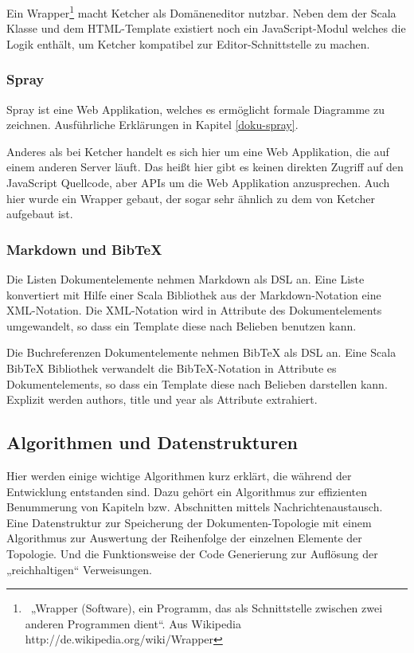  
Ein Wrapper\footnote{~„Wrapper (Software), ein Programm, das als Schnittstelle zwischen zwei anderen Programmen dient“. Aus Wikipedia http://de.wikipedia.org/wiki/Wrapper} macht Ketcher als Domäneneditor nutzbar. Neben dem der Scala Klasse und dem HTML-Template existiert noch ein JavaScript-Modul welches die Logik enthält, um Ketcher kompatibel zur Editor-Schnittstelle zu machen.

 
\subsubsection{Spray}\label{}

 
Spray ist eine Web Applikation, welches es ermöglicht formale Diagramme zu zeichnen. Ausführliche Erklärungen in Kapitel \ref{doku-spray}.

 
Anderes als bei Ketcher handelt es sich hier um eine Web Applikation, die auf einem anderen Server läuft. Das heißt hier gibt es keinen direkten Zugriff auf den JavaScript Quellcode, aber APIs um die Web Applikation anzusprechen. Auch hier wurde ein Wrapper gebaut, der sogar sehr ähnlich zu dem von Ketcher aufgebaut ist.

 
\subsubsection{Markdown und BibTeX}\label{}

 
Die Listen Dokumentelemente nehmen Markdown als DSL an. Eine Liste konvertiert mit Hilfe einer Scala Bibliothek aus der Markdown-Notation eine XML-Notation. Die XML-Notation wird in Attribute des Dokumentelements umgewandelt, so dass ein Template diese nach Belieben benutzen kann.

 
Die Buchreferenzen Dokumentelemente nehmen BibTeX als DSL an. Eine Scala BibTeX Bibliothek verwandelt die BibTeX-Notation in Attribute es Dokumentelements, so dass ein Template diese nach Belieben darstellen kann. Explizit werden authors, title und year als Attribute extrahiert.

 
\subsection{Algorithmen und Datenstrukturen}\label{}
 
Hier werden einige wichtige Algorithmen kurz erklärt, die während der Entwicklung entstanden sind. Dazu gehört ein Algorithmus zur effizienten Benummerung von Kapiteln bzw. Abschnitten mittels Nachrichtenaustausch. Eine Datenstruktur zur Speicherung der Dokumenten-Topologie mit einem Algorithmus zur Auswertung der Reihenfolge der einzelnen Elemente der Topologie. Und die Funktionsweise der Code Generierung zur Auflösung der „reichhaltigen“ Verweisungen.

